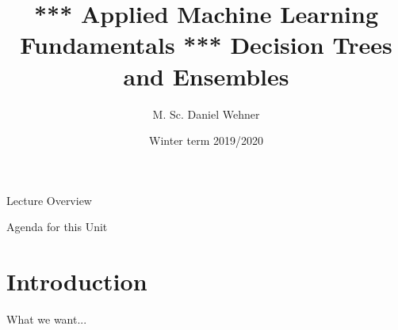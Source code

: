 


\title[Decision Trees and Ensembles]{*** Applied Machine Learning Fundamentals *** Decision Trees and Ensembles}
\author{M. Sc. Daniel Wehner}
\date{Winter term 2019/2020}




\maketitlepage


\begin{frame}{Lecture Overview}{}
\end{frame}


\begin{frame}{Agenda for this Unit}
	\begin{multicols}{2}
		\tableofcontents
	\end{multicols}
\end{frame}


\section{Introduction}

\begin{frame}{What we want...}{}
\end{frame}


